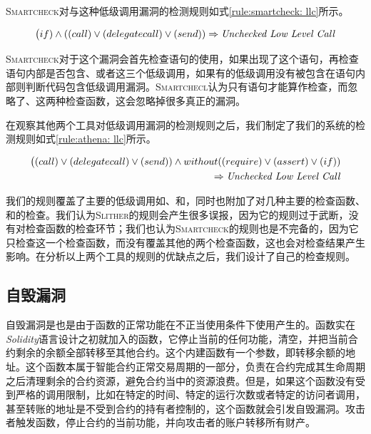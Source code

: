 \textsc{Smartcheck}对与这种低级调用漏洞的检测规则如式\ref{rule:smartcheck: llc}所示。
\begin{mdframed}[
	linewidth = 1pt,
	innertopmargin = -5pt,
	innerbottommargin = 3pt,
	outerlinewidth = 1pt
	]
    \small
	\begin{equation} \label{rule:smartcheck: llc}
    \big (if) \wedge ((call) \vee (delegatecall) \vee (send)) \Rightarrow \text{\emph{Unchecked Low Level Call}}
	\end{equation}
\end{mdframed}
\textsc{Smartcheck}对于这个漏洞会首先检查语句的使用，如果出现了这个语句，再检查语句内部是否包含、或者这三个低级调用，如果有的低级调用没有被包含在语句内部则判断代码包含低级调用漏洞。\textsc{Smartchecl}认为只有语句才能算作检查，而忽略了、这两种检查函数，这会忽略掉很多真正的漏洞。

在观察其他两个工具对低级调用漏洞的检测规则之后，我们制定了我们的系统的检测规则如式\ref{rule:athena: llc}所示。
\begin{mdframed}[
	linewidth = 1pt,
	innertopmargin = -5pt,
	innerbottommargin = 3pt,
	outerlinewidth = 1pt
	]
    \small
	\begin{equation} \label{rule:athena: llc}
    \begin{split}
       \big ((call) \vee (delegatecall) \vee (send)) \wedge without ((require) \vee (assert) \vee (if))  \\
        \Rightarrow \text{\emph{Unchecked Low Level Call}}
    \end{split}
	\end{equation}
\end{mdframed}
我们的规则覆盖了主要的低级调用如、和，同时也附加了对几种主要的检查函数、和的检查。我们认为\textsc{Slither}的规则会产生很多误报，因为它的规则过于武断，没有对检查函数的检查环节；我们也认为\textsc{Smartcheck}的规则也是不完备的，因为它只检查这一个检查函数，而没有覆盖其他的两个检查函数，这也会对检查结果产生影响。在分析以上两个工具的规则的优缺点之后，我们设计了自己的检查规则。

\subsection{自毁漏洞}
自毁漏洞是也是由于函数的正常功能在不正当使用条件下使用产生的。函数实在\emph{Solidity}语言设计之初就加入的函数，它停止当前的任何功能，清空，并把当前合约剩余的余额全部转移至其他合约。这个内建函数有一个参数，即转移余额的地址。这个函数本属于智能合约正常交易周期的一部分，负责在合约完成其生命周期之后清理剩余的合约资源，避免合约当中的资源浪费。但是，如果这个函数没有受到严格的调用限制，比如在特定的时间、特定的运行次数或者特定的访问者调用，甚至转账的地址是不受到合约的持有者控制的，这个函数就会引发自毁漏洞。攻击者触发函数，停止合约的当前功能，并向攻击者的账户转移所有财产。

